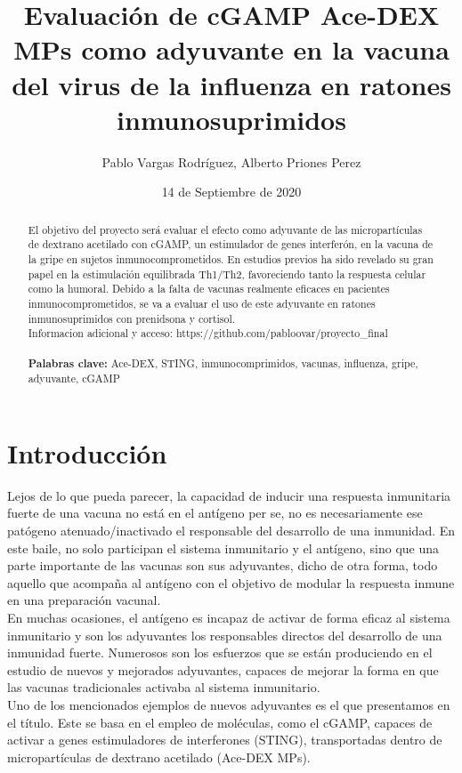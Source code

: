 \documentclass[a4paper,11pt]{article}
\providecommand{\keywords}[1]{\textbf{Palabras clave:} #1}
\begin{document}
	\title{Evaluación de cGAMP Ace-DEX MPs como adyuvante en la vacuna del virus de la influenza en ratones inmunosuprimidos}
	\author{Pablo Vargas Rodríguez, Alberto Priones Perez}
	\date{14 de Septiembre de 2020}
	\maketitle
	\begin{abstract}
El objetivo del proyecto será evaluar el efecto como adyuvante de las micropartículas de dextrano acetilado con cGAMP, un estimulador de genes interferón, en la vacuna de la gripe en sujetos inmunocomprometidos. En estudios previos ha sido revelado su gran papel en la estimulación equilibrada Th1/Th2, favoreciendo tanto la respuesta celular como la humoral. Debido a la falta de vacunas realmente eficaces en pacientes inmunocomprometidos, se va a evaluar el uso de este adyuvante en ratones inmunosuprimidos con prenidsona y cortisol.\\
Informacion adicional y acceso: https://github.com/pabloovar/proyecto\_final
\\ \\
\keywords{Ace-DEX, STING, inmunocomprimidos, vacunas, influenza, gripe, adyuvante, cGAMP}
	\end{abstract}

\section{Introducción}
Lejos de lo que pueda parecer, la capacidad de inducir una respuesta inmunitaria fuerte de una vacuna no está en el antígeno per se, no es necesariamente ese patógeno atenuado/inactivado el responsable del desarrollo de una inmunidad. En este baile, no solo participan el sistema inmunitario y el antígeno, sino que una parte importante de las vacunas son sus adyuvantes, dicho de otra forma, todo aquello que acompaña al antígeno con el objetivo de modular la respuesta inmune en una preparación vacunal.
\\En muchas ocasiones, el antígeno es incapaz de activar de forma eficaz al sistema inmunitario y son los adyuvantes los responsables directos del desarrollo de una inmunidad fuerte.
Numerosos son los esfuerzos que se están produciendo en el estudio de nuevos y mejorados adyuvantes, capaces de mejorar la forma en que las vacunas tradicionales activaba al sistema inmunitario.
\\Uno de los mencionados ejemplos de nuevos adyuvantes es el que presentamos en el título. Este se basa en el empleo de moléculas, como el cGAMP, capaces de activar a genes estimuladores de interferones (STING), transportadas dentro de micropartículas de dextrano acetilado (Ace-DEX MPs).\cite{Ady}
\end{document}
